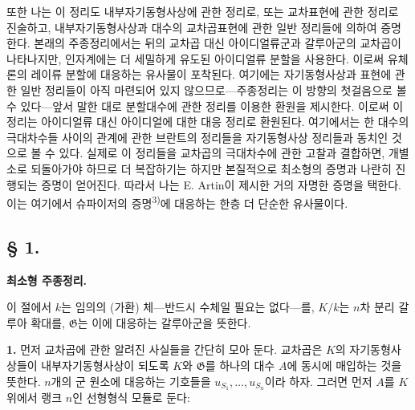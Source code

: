 또한 나는 이 정리도 내부자기동형사상에 관한 정리로, 또는 교차표현에 관한 정리로 진술하고, 내부자기동형사상과 대수의 교차곱표현에 관한 일반 정리들에 의하여 증명한다. 본래의 주종정리에서는 뒤의 교차곱 대신 아이디얼류군과 갈루아군의 교차곱이 나타나지만, 인자계에는 더 세밀하게 유도된 아이디얼류 분할을 사용한다. 이로써 유체론의 레이류 분할에 대응하는 유사물이 포착된다. 여기에는 자기동형사상과 표현에 관한 일반 정리들이 아직 마련되어 있지 않으므로---주종정리는 이 방향의 첫걸음으로 볼 수 있다---앞서 말한 대로 분할대수에 관한 정리를 이용한 환원을 제시한다. 이로써 이 정리는 아이디얼류 대신 아이디얼에 대한 대응 정리로 환원된다. 여기에서는 한 대수의 극대차수들 사이의 관계에 관한 브란트의 정리들을 자기동형사상 정리들과 동치인 것으로 볼 수 있다. 실제로 이 정리들을 교차곱의 극대차수에 관한 고찰과 결합하면, 개별 소로 되돌아가야 하므로 더 복잡하기는 하지만 본질적으로 최소형의 증명과 나란히 진행되는 증명이 얻어진다. 따라서 나는 E. Artin이 제시한 거의 자명한 증명을 택한다. 이는 여기에서 슈파이저의 증명\textsuperscript{3)}에 대응하는 한층 더 단순한 유사물이다.

\subsection*{§ 1.}
\begin{center}
\textbf{최소형 주종정리.}
\end{center}

이 절에서 \(k\)는 임의의 (가환) 체---반드시 수체일 필요는 없다---를, \(K/k\)는 \(n\)차 분리 갈루아 확대를, \(\mathfrak G\)는 이에 대응하는 갈루아군을 뜻한다.

\noindent\textbf{1.} 먼저 교차곱에 관한 알려진 사실들을 간단히 모아 둔다. 교차곱은 \(K\)의 자기동형사상들이 내부자기동형사상이 되도록 \(K\)와 \(\mathfrak G\)를 하나의 대수 \(A\)에 동시에 매입하는 것을 뜻한다. \(n\)개의 군 원소에 대응하는 기호들을 \(u_{S_1},\ldots,u_{S_n}\)이라 하자. 그러면 먼저 \(A\)를 \(K\) 위에서 랭크 \(n\)인 선형형식 모듈로 둔다:

